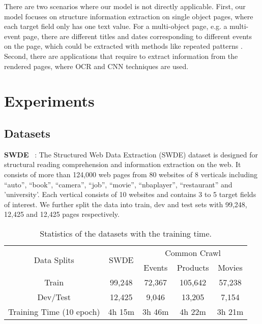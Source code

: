 \documentclass[sigconf]{acmart}
\begin{document}
There are two scenarios where our model is not directly applicable. First, our model focuses on structure information extraction on single object pages, where each target field only has one text value. For a multi-object page, e.g. a multi-event page, there are different titles and dates corresponding to different events on the page, which could be extracted with methods like repeated patterns \cite{AdelfioS13,WangKGS19}. Second, there are applications that require to extract information from the rendered pages, where OCR and CNN \cite{XuL0HW020} techniques are used.

\section{Experiments}
\subsection{Datasets}
\noindent\textbf{SWDE} ~\cite{HaoCPZ11,abs-2101-02415}: The Structured Web Data Extraction (SWDE) dataset is designed for structural reading comprehension and information extraction on the web. It consists of more than 124,000 web pages from 80 websites of 8 verticals including ``auto'', ``book'', ``camera'', ``job'', ``movie'', ``nbaplayer'', ``restaurant'' and 'university'. Each vertical consists of 10 websites and contains 3 to 5 target fields of interest.
We further split the data into train, dev and test sets with 99,248, 12,425 and 12,425 pages respectively.
\begin{table}
\begin{adjustbox}{width=1\columnwidth,center}
\begin{tabular}{c|c|c|c|c}
\hline
\multirow{2}{*}{ Data Splits} &	\multirow{2}{*}{SWDE} & \multicolumn{3}{c}{Common Crawl} \\
\cline{3-5}
& &Events & Products & Movies \\
\hline
Train  &99,248   &72,367 &105,642 &57,238   \\
Dev/Test    &12,425 & 9,046  &  13,205  &7,154\\
\hline
Training Time (10 epoch)    &4h 15m & 3h 46m  &  4h 22m  &3h 21m\\
\hline
\end{tabular}
\end{adjustbox}
\caption{Statistics of the datasets with the training time.} \label{table:data}
\end{table}
\end{document}
